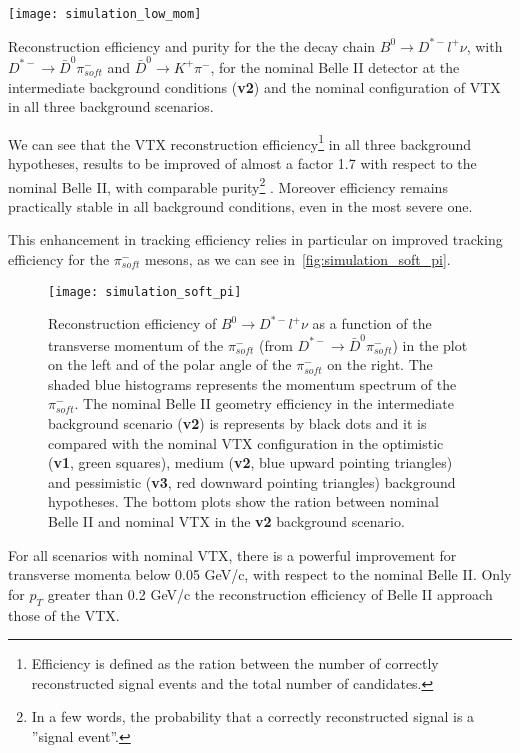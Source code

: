 \begin{table}[h!]
\centering
\texttt{[image: simulation\_low\_mom]}
\caption{Reconstruction efficiency and purity for the the decay chain $B^{0} \rightarrow D^{*-}l^{+}\nu$, with $D^{*-} \rightarrow \bar{D}^{0} \pi^{-}_{soft}$ and $\bar{D}^{0} \rightarrow K^{+} \pi^{-}$, for the nominal Belle II detector at the intermediate background conditions (\textbf{v2}) and the nominal configuration of VTX in all three background scenarios.}
\label{tab:simulation_low_mom}
\end{table}

We can see that the VTX reconstruction efficiency\footnote{Efficiency is defined as the ration between the number of correctly reconstructed signal events and the total number of candidates.}  in all three background hypotheses, results to be improved of almost a factor 1.7 with respect to the nominal Belle II, with comparable purity\footnote{In a few words, the probability that a correctly reconstructed signal  is a ''signal event''.} . Moreover efficiency remains practically stable in all background conditions, even in the most severe one.

This enhancement in tracking efficiency relies in particular on improved tracking efficiency for the $\pi_{soft}^{-}$ mesons, as we can see in~\autoref{fig:simulation_soft_pi}.


\begin{figure}[h!]
\centering
\texttt{[image: simulation\_soft\_pi]}
\caption{Reconstruction efficiency of $B^{0} \rightarrow D^{*-}l^{+}\nu$ as a function of the transverse momentum of the $\pi_{soft}^{-}$ (from  $D^{*-} \rightarrow \bar{D}^{0} \pi^{-}_{soft}$) in the plot on the left and of the polar angle of the $\pi_{soft}^{-}$ on the right. 
The shaded blue histograms represents the momentum spectrum of the  $\pi_{soft}^{-}$.
The nominal Belle II geometry efficiency in the intermediate background scenario (\textbf{v2}) is represents by black dots and it is compared with the nominal VTX configuration in the optimistic (\textbf{v1}, green squares), medium (\textbf{v2}, blue upward pointing triangles) and pessimistic (\textbf{v3}, red downward
pointing triangles) background hypotheses. The bottom plots show the ration between nominal Belle II and nominal VTX in the \textbf{v2} background scenario.}
\label{fig:simulation_soft_pi}
\end{figure}

For all scenarios with nominal VTX, there is a powerful improvement for transverse momenta below 0.05 GeV/c, with respect to the nominal Belle II. Only for $p_{T}$ greater than 0.2 GeV/c the reconstruction efficiency of Belle II approach those of the VTX.\\

